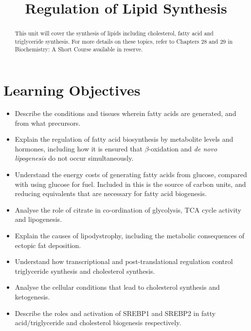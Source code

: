 \documentclass{tufte-handout}
\title{Regulation of Lipid Synthesis}
\author{}
\date{}  %
\begin{document}
\maketitle%

\begin{abstract}
\noindent This unit will cover the synthesis of lipids including cholesterol, fatty acid and triglyceride synthesis.  For more details on these topics, refer to Chapters 28 and 29 in Biochemistry: A Short Course available in reserve\cite{Berg2015}.
\end{abstract}

\tableofcontents

\pagebreak
\section{Learning Objectives}

\begin{itemize}
\item Describe the conditions and tissues wherein fatty acids are generated, and from what precursors.
\item Explain the regulation of fatty acid biosynthesis by metabolite levels and hormones, including how it is ensured that $\beta$-oxidation and \textit{de novo lipogenesis} do not occur simultaneously.
\item Understand the energy costs of generating fatty acids from glucose, compared with using glucose for fuel.  Included in this is the source of carbon units, and reducing equivalents that are necessary for fatty acid biogenesis.
\item Analyse the role of citrate in co-ordination of glycolysis, TCA cycle activity and lipogenesis.
\item Explain the causes of lipodystrophy, including the metabolic consequences of ectopic fat deposition.
\item Understand how transcriptional and post-translational regulation control triglyceride synthesis and cholesterol synthesis.
\item Analyse the cellular conditions that lead to cholesterol synthesis and ketogenesis.
\item Describe the roles and activation of SREBP1 and SREBP2 in fatty acid/triglyceride and cholesterol biogenesis respectively.



\end{itemize}
\end{document}
